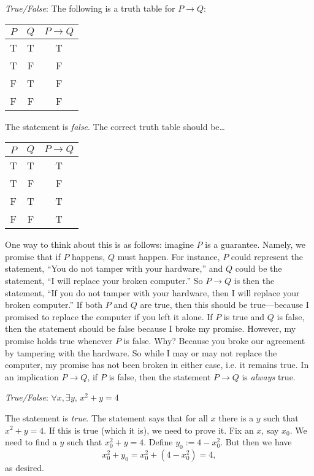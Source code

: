\documentclass[11pt,letterpaper]{article}
\begin{document}
\thispagestyle{title}

\quizsol \textit{True/False}: The following is a truth table for $P \to Q$:
	\begin{table}[!ht]
	\centering
	\begin{tabular}{c|c||c}
	$P$ & $Q$ & $P \to Q$ \\ \hline
	T & T& T \\
	T & F & F \\
	F & T & F \\
	F & F & F
	\end{tabular}
	\end{table}

\sol The statement is \textit{false}. The correct truth table should be\dots
	\begin{table}[!ht]
	\centering
	\begin{tabular}{c|c||c}
	$P$ & $Q$ & $P \to Q$ \\ \hline
	T & T& T \\
	T & F & F \\
	F & T & T \\
	F & F & T
	\end{tabular}
	\end{table} \par
One way to think about this is as follows: imagine $P$ is a guarantee. Namely, we promise that if $P$ happens, $Q$ must happen. For instance, $P$ could represent the statement, ``You do not tamper with your hardware,'' and $Q$ could be the statement, ``I will replace your broken computer.'' So $P \to Q$ is then the statement, ``If you do not tamper with your hardware, then I will replace your broken computer.'' If both $P$ and $Q$ are true, then this should be true---because I promised to replace the computer if you left it alone. If $P$ is true and $Q$ is false, then the statement should be false because I broke my promise. However, my promise holds true whenever $P$ is false. Why? Because you broke our agreement by tampering with the hardware. So while I may or may not replace the computer, my promise has not been broken in either case, i.e. it remains true. In an implication $P \to Q$, if $P$ is false, then the statement $P \to Q$ is \textit{always} true. \pvspace{1.5cm}



\quizsol \textit{True/False}: $\forall x, \exists y, \, x^2 + y= 4$ \pspace

\sol The statement is \textit{true}. The statement says that for all $x$ there is a $y$ such that $x^2 + y= 4$. If this is true (which it is), we need to prove it. Fix an $x$, say $x_0$. We need to find a $y$ such that $x_0^2 + y = 4$. Define $y_0:= 4 - x_0^2$. But then we have 
	\[
	x_0^2 + y_0= x_0^2 + (4 - x_0^2)= 4,
	\]
as desired. \pvspace{1.5cm}
\end{document}
